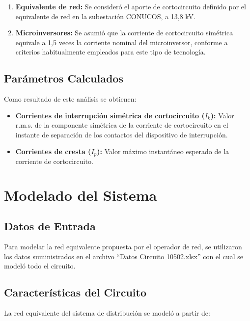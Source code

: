\begin{enumerate}
    \item \textbf{Equivalente de red:} Se consideró el aporte de cortocircuito definido por el equivalente de red en la subestación CONUCOS, a 13,8 kV.
    
    \item \textbf{Microinversores:} Se asumió que la corriente de cortocircuito simétrica equivale a 1,5 veces la corriente nominal del microinversor, conforme a criterios habitualmente empleados para este tipo de tecnología.
\end{enumerate}

\subsection{Parámetros Calculados}

Como resultado de este análisis se obtienen:

\begin{itemize}
    \item \textbf{Corrientes de interrupción simétrica de cortocircuito ($I_k$):} Valor r.m.s. de la componente simétrica de la corriente de cortocircuito en el instante de separación de los contactos del dispositivo de interrupción.
    \item \textbf{Corrientes de cresta ($I_p$):} Valor máximo instantáneo esperado de la corriente de cortocircuito.
\end{itemize}

\section{Modelado del Sistema}

\subsection{Datos de Entrada}

Para modelar la red equivalente propuesta por el operador de red, se utilizaron los datos suministrados en el archivo ``Datos Circuito 10502.xlsx'' con el cual se modeló todo el circuito.

\subsection{Características del Circuito}

La red equivalente del sistema de distribución se modeló a partir de:

